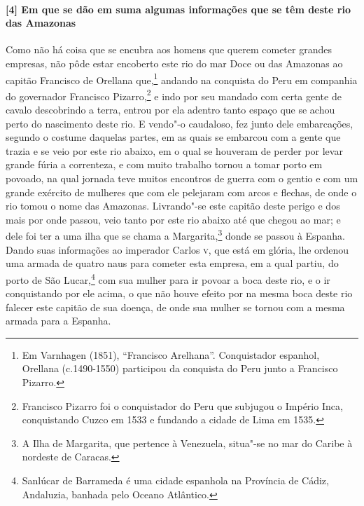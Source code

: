 \begin{linenumbers}
\paragraph{[4] Em que se dão em suma algumas informações que se têm deste rio das Amazonas} \quad
Como não há coisa que se encubra aos homens que querem cometer grandes empresas, não pôde
estar encoberto este rio do mar Doce ou das Amazonas ao capitão Francisco de Orellana
que,\footnote{ Em Varnhagen (1851), ``Francisco Arelhana''. Conquistador espanhol,
Orellana (c.1490-1550) participou da conquista do Peru junto a Francisco Pizarro.} andando
na conquista do Peru em companhia do governador Francisco Pizarro,\footnote{ Francisco
Pizarro foi o conquistador do Peru que subjugou o Império Inca, conquistando Cuzco em 1533
e fundando a cidade de Lima em 1535.} e indo por seu mandado com certa gente de cavalo
descobrindo a terra, entrou por ela adentro tanto espaço que se achou perto do nascimento
deste rio. E vendo"-o caudaloso, fez junto dele embarcações, segundo o costume daquelas
partes, em as quais se embarcou com a gente que trazia e se veio por este rio abaixo, em o
qual se houveram de perder por levar grande fúria a correnteza, e com muito trabalho
tornou a tomar porto em povoado, na qual jornada teve muitos encontros de guerra com o
gentio e com um grande exército de mulheres que com ele pelejaram com arcos e flechas, de
onde o rio tomou o nome das Amazonas. Livrando"-se este capitão deste perigo e dos mais por
onde passou, veio tanto por este rio abaixo até que chegou ao mar; e dele foi ter a uma
ilha que se chama a Margarita,\footnote{ A Ilha de Margarita, que pertence à Venezuela,
situa"-se no mar do Caribe à nordeste de Caracas.} donde se passou à Espanha. Dando suas
informações ao imperador Carlos \textsc{v}, que está em glória, lhe ordenou uma armada de
quatro naus para cometer esta empresa, em a qual partiu, do porto de São Lucar,\footnote{
Sanlúcar de Barrameda é uma cidade espanhola na Província de Cádiz, Andaluzia, banhada
pelo Oceano Atlântico.} com sua mulher para ir povoar a boca deste rio, e o ir
conquistando por ele acima, o que não houve efeito por na mesma boca deste rio falecer
este capitão de sua doença, de onde sua mulher se tornou com a mesma armada para a
Espanha.


\end{linenumbers}
